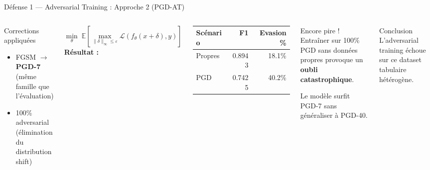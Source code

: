 \documentclass[aspectratio=169,11pt]{beamer}
\begin{document}
\begin{frame}{D\'efense 1 --- Adversarial Training : Approche 2 (PGD-AT)}
\begin{columns}[T]
\begin{block}{Corrections appliqu\'ees}
\begin{itemize}
    \item FGSM $\rightarrow$ \textbf{PGD-7} (m\^eme famille que l'\'evaluation)
    \item 100\% adversarial (\'elimination du distribution shift)
\end{itemize}
\end{block}
\vspace{0.2em}
\[
\min_\theta\; \mathbb{E}\!\left[\max_{\|\delta\|_\infty \leq \varepsilon} \mathcal{L}(f_\theta(x+\delta), y)\right]
\]
\textbf{R\'esultat :}
\begin{table}
\scriptsize
\begin{tabular}{lrr}
\toprule
Sc\'enario & F1 & Evasion\% \\
\midrule
Propres & 0.8943 & 18.1\% \\
\rowcolor{myred!30}
PGD & 0.7425 & \alert{40.2\%} \\
\bottomrule
\end{tabular}
\end{table}

\begin{alertblock}{Encore pire !}
Entra\^iner sur 100\% PGD sans donn\'ees propres provoque un \textbf{oubli catastrophique}.

\medskip
Le mod\`ele surfit PGD-7 sans g\'en\'eraliser \`a PGD-40.
\end{alertblock}
\vspace{0.3em}
\begin{block}{Conclusion}
L'adversarial training \'echoue sur ce dataset tabulaire h\'et\'erog\`ene.
\end{block}
\end{columns}
\end{frame}
\end{document}
